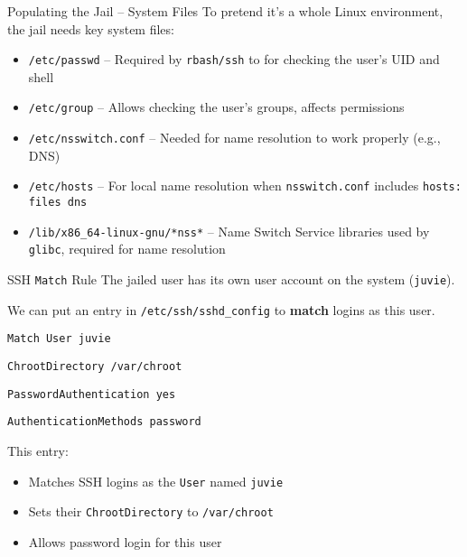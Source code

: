 \documentclass[14pt,compress,dvipsnames,aspectratio=169]{beamer} %
\begin{document}
\begin{frame}{Populating the Jail -- System Files}
    To pretend it's a whole Linux environment, the jail needs key system files:
    \begin{itemize}
        \item{\texttt{/etc/passwd} -- Required by \texttt{rbash/ssh} to for checking the user's UID and shell} 
        \item{\texttt{/etc/group} -- Allows checking the user's groups, affects permissions} 
        \item{\texttt{/etc/nsswitch.conf} -- Needed for name resolution to work
            properly (e.g., DNS)} 
        \item{\texttt{/etc/hosts} -- For local name resolution when
            \texttt{nsswitch.conf} includes \texttt{hosts: files dns}} 
        \item{\texttt{/lib/x86\_64-linux-gnu/*nss*} -- Name Switch Service libraries
            used by \texttt{glibc}, required for name resolution} 
    \end{itemize}
    \vspace{0.5em}
\end{frame}


\begin{frame}{SSH \texttt{Match} Rule}
    The jailed user has its own user account on the system (\texttt{juvie}).  

    \vspace{0.25cm}
    We can put an entry in \texttt{/etc/ssh/sshd\_config} to \textbf{match} logins
    as this user.  
    \vspace{0.25cm}

    \texttt{Match User juvie}

    \hspace{1.0cm}\texttt{ChrootDirectory /var/chroot}

    \hspace{1.0cm}\texttt{PasswordAuthentication yes}

    \hspace{1.0cm}\texttt{AuthenticationMethods password}

    \vspace{0.25cm}
    This entry:
    \begin{itemize}
        \item{Matches SSH logins as the \texttt{User} named \texttt{juvie}} 
        \item{Sets their \texttt{ChrootDirectory} to \texttt{/var/chroot}} 
        \item{Allows password login for this user} 
    \end{itemize}
\end{frame}
\end{document}
